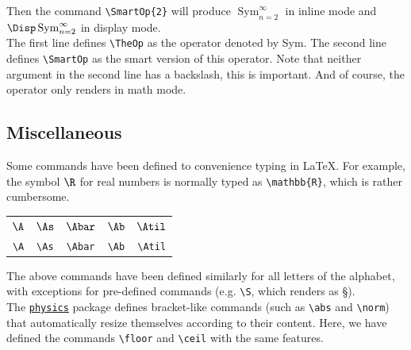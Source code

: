 \documentclass{article}
\begin{document}
{Then the command \verb!\SmartOp{2}! will produce $\operatorname*{Sym}_{n=2}^\infty$ in inline mode and $\Disp\operatorname*{Sym}_{n=2}^\infty$ in display mode.\\

The first line defines \verb!\TheOp! as the operator denoted by Sym. The second line defines \verb!\SmartOp! as the smart version of this operator. Note that neither argument in the second line has a backslash, this is important. And of course, the operator only renders in math mode.

\subsection{Miscellaneous}

Some commands have been defined to convenience typing in \LaTeX. For example, the symbol $\R$ for real numbers is normally typed as \verb!\mathbb{R}!, which is rather cumbersome.

\begin{center}
    \begin{tabular}{*{5}{c}} %
        $\A$ & $\As$ & $\Abar$ & $\Ab$ & $\Atil$ \\
        \verb!\A! & \verb!\As! & \verb!\Abar! & \verb!\Ab! & \verb!\Atil!
    \end{tabular}
\end{center}

The above commands have been defined similarly for all letters of the alphabet, with exceptions for pre-defined commands (e.g. \verb!\S!, which renders as \S).\\

The \href{https://ctan.org/pkg/physics}{\texttt{physics}} package defines bracket-like commands (such as \verb!\abs! and \verb!\norm!) that automatically resize themselves according to their content. Here, we have defined the commands \verb!\floor! and \verb!\ceil! with the same features.

}
\end{document}
